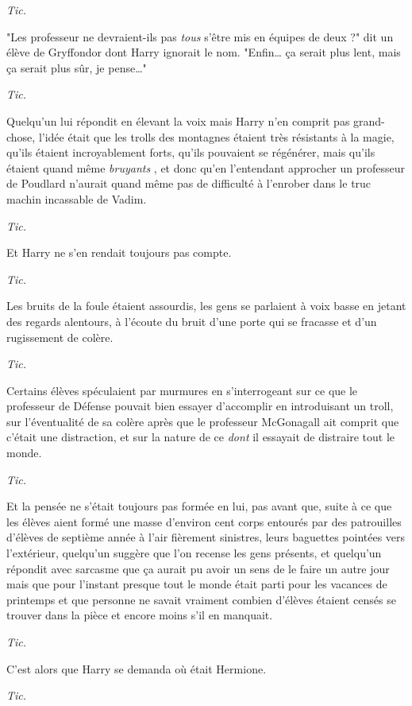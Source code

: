\emph{Tic.} 

"Les professeur ne devraient-ils pas \emph{tous}  s'être mis en équipes de deux ?" dit un élève de Gryffondor dont Harry ignorait le nom. "Enfin… ça serait plus lent, mais ça serait plus sûr, je pense…"

\emph{Tic.} 

Quelqu'un lui répondit en élevant la voix mais Harry n'en comprit pas grand-chose, l'idée était que les trolls des montagnes étaient très résistants à la magie, qu'ils étaient incroyablement forts, qu'ils pouvaient se régénérer, mais qu'ils étaient quand même \emph{bruyants} , et donc qu'en l'entendant approcher un professeur de Poudlard n'aurait quand même pas de difficulté à l'enrober dans le truc machin incassable de Vadim.

\emph{Tic.} 

Et Harry ne s'en rendait toujours pas compte.

\emph{Tic.} 

Les bruits de la foule étaient assourdis, les gens se parlaient à voix basse en jetant des regards alentours, à l'écoute du bruit d'une porte qui se fracasse et d'un rugissement de colère.

\emph{Tic.} 

Certains élèves spéculaient par murmures en s'interrogeant sur ce que le professeur de Défense pouvait bien essayer d'accomplir en introduisant un troll, sur l'éventualité de sa colère après que le professeur McGonagall ait comprit que c'était une distraction, et sur la nature de ce \emph{dont}  il essayait de distraire tout le monde.

\emph{Tic.} 

Et la pensée ne s'était toujours pas formée en lui, pas avant que, suite à ce que les élèves aient formé une masse d'environ cent corps entourés par des patrouilles d'élèves de septième année à l'air fièrement sinistres, leurs baguettes pointées vers l'extérieur, quelqu'un suggère que l'on recense les gens présents, et quelqu'un répondit avec sarcasme que ça aurait pu avoir un sens de le faire un autre jour mais que pour l'instant presque tout le monde était parti pour les vacances de printemps et que personne ne savait vraiment combien d'élèves étaient censés se trouver dans la pièce et encore moins s'il en manquait.

\emph{Tic.} 

C'est alors que Harry se demanda où était Hermione.

\emph{Tic.} 

